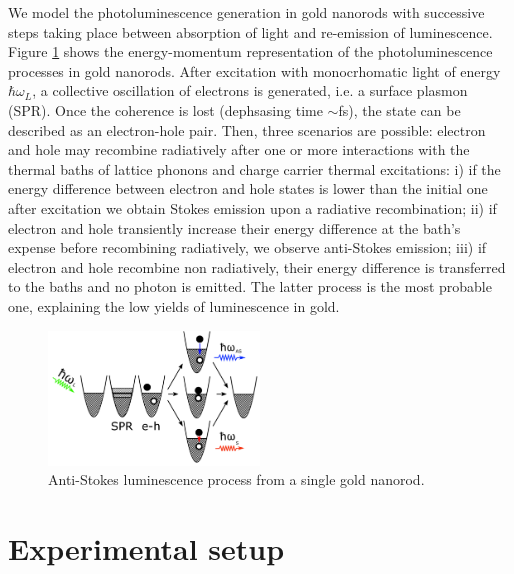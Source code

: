 \documentclass[journal=nalefd,manuscript=letter]{achemso}
\begin{document}
We model the photoluminescence generation in gold nanorods with successive 
steps taking place between absorption of light and re-emission of luminescence\cite{Carattino2016a}. 
Figure \ref{fig:anti-Stokes-process} shows the energy-momentum representation
of the photoluminescence processes in gold nanorods. 
After excitation with monocrhomatic light of energy $\hbar \omega_L$, 
a collective oscillation of electrons is generated, i.e. a surface plasmon (SPR). 
Once the coherence is lost (dephsasing time $\sim$fs), the state can be described as an
electron-hole pair. Then, three scenarios are possible: electron and hole may
recombine radiatively after one or more interactions with the thermal baths of
lattice phonons and charge carrier thermal excitations: i) if the energy
difference between electron and hole states is lower than the initial one after
excitation we obtain Stokes emission upon a radiative recombination; ii) if
electron and hole transiently increase their energy difference at the bath's
expense before recombining radiatively, we observe anti-Stokes emission; iii) if
electron and hole recombine non radiatively, their energy difference is
transferred to the baths and no photon is emitted. The latter process is the
most probable one, explaining the low yields of luminescence in gold. 

\begin{figure}[htp] \centering
\includegraphics[width=0.5\textwidth]{Figures/Supplementary/01_AS_Scheme/luminescence_all_AS.png}
\caption{Anti-Stokes luminescence process from a single gold nanorod. }
	\label{fig:anti-Stokes-process}
\end{figure}


\section{Experimental setup}\label{sec:setup}
\end{document}
